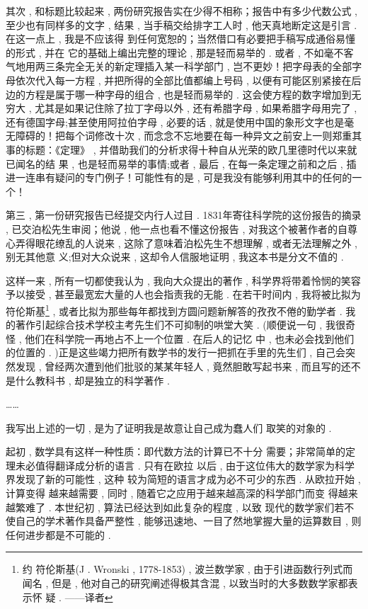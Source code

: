 其次 , 和标题比较起来 , 两份研究报告实在少得不相称；报告中有多少代数公式 , 至少也有同样多的文字 , 结果 , 当手稿交给排字工人时 , 他天真地断定这是引言 . 在这一点上 , 我是不应该得 到任何宽恕的；当然借口有必要把手稿写成通俗易懂的形式 , 并在 它的基础上编出完整的理论 , 那是轻而易举的 . 或者 , 不如毫不客 气地用两三条完全无关的新定理插入某一科学部门 , 岂不更妙！把字母表的全部字母依次代入每一方程 , 并把所得的全部比值都编上号码 , 以便有可能区别紧接在后边的方程是属于哪一种字母的组合 , 也是轻而易举的 . 这会使方程的数字增加到无穷大 , 尤其是如果记住除了拉丁字母以外 , 还有希腊字母 , 如果希腊字母用完了 , 还有德国字母;甚至使用阿拉伯字母 , 必要的话 , 就是使用中国的象形文字也是毫无障碍的！把每个词修改十次 , 而念念不忘地要在每一种异文之前安上一则郑重其事的标题：《定理》 , 并借助我们的分析求得十种自从光荣的欧几里德时代以来就已闻名的结 果 , 也是轻而易举的事情;或者 , 最后 , 在每一条定理之前和之后 ,  插进一连串有疑问的专门例子！可能性有的是 , 可是我没有能够利用其中的任何的一个！

第三 , 第一份研究报告已经提交内行人过目 . 1831年寄往科学院的这份报告的摘录 , 已交泊松先生审阅；他说 , 他一点也看不懂这份报告 , 对我这个被著作者的自尊心弄得眼花缭乱的人说来 , 这除了意味着泊松先生不想理解 , 或者无法理解之外 , 别无其他意 义;但对大众说来 , 这却令人信服地证明 , 我这本书是分文不值的 . 

这样一来 , 所有一切都使我认为 , 我向大众提出的著作 , 科学界将带着怜悯的笑容予以接受 , 甚至最宽宏大量的人也会指责我的无能 . 在若干时间内 , 我将被比拟为符伦斯基\footnote{约 \textbullet 符伦斯基(J . Wronski , 1778-1853) , 波兰数学家 , 由于引进函数行列式而 闻名 , 但是 , 他对自己的研究阐述得极其含混 , 以致当时的大多数数学家都表示怀 疑 . ——译者} , 或者比拟为那些每年都找到方圆问题新解答的孜孜不倦的勤学者 . 我的著作引起综合技术学校主考先生们不可抑制的哄堂大笑 . (顺便说一句 , 我很奇怪 , 他们在科学院一再地占不上一个位置 . 在后人的记忆 中 , 也未必会找到他们的位置的 . )正是这些竭力把所有数学书的发行一把抓在手里的先生们 , 自己会突然发现 , 曾经两次遭到他们批驳的某某年轻人 , 竟然胆敢写起书来 , 而且写的还不是什么教科书 , 却是独立的科学著作 . 

……

我写出上述的一切 , 是为了证明我是故意让自己成为蠢人们 取笑的对象的 . 

起初 , 数学具有这样一种性质：即代数方法的计算已不十分 需要；非常简单的定理未必值得翻译成分析的语言 . 只有在欧拉 以后 , 由于这位伟大的数学家为科学界发现了新的可能性 , 这种 较为简短的语言才成为必不可少的东西 . 从欧拉开始 , 计算变得 越来越需要 , 同时 , 随着它之应用于越来越高深的科学部门而变 得越来越繁难了 . 本世纪初 , 算法已经达到如此复杂的程度 , 以致 现代的数学家们若不使自己的学术著作具备严整性 , 能够迅速地、一目了然地掌握大量的运算数目 , 则任何进步都是不可能的 . 

